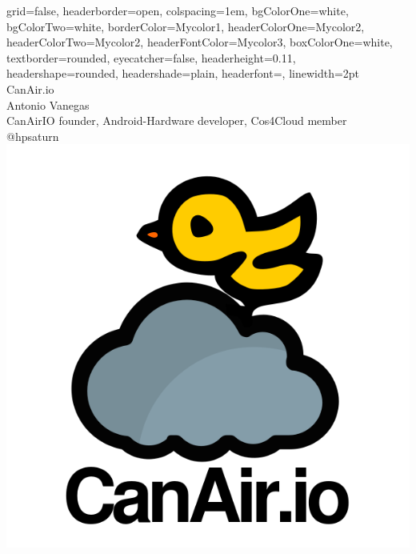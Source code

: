 \documentclass[a0paper,portrait]{baposter}
\begin{document}



\begin{poster}
{
grid=false,
headerborder=open, %
colspacing=1em, %
bgColorOne=white, %
bgColorTwo=white, %
borderColor=Mycolor1, %
headerColorOne=Mycolor2, %
headerColorTwo=Mycolor2, %
headerFontColor=Mycolor3, %
boxColorOne=white, %
textborder=rounded, %
eyecatcher=false, %
headerheight=0.11\textheight, %
headershape=rounded, %
headershade=plain,
headerfont=\Large\textsf, %
linewidth=2pt %
}
{}
%
%
{
  \textsf %
  {
    \hspace{-0.7cm}
    {CanAir.io}
  }
} %
{\sf\vspace{0.2em}\\
Antonio Vanegas  %
\vspace{0.1em}\\
\small{ CanAirIO founder, Android-Hardware developer, Cos4Cloud member
\vspace{0.2em}\\
@hpsaturn  %
}
}
{\includegraphics[width=.14\linewidth]{images/logo.png}} %



\end{poster}
\end{document}
